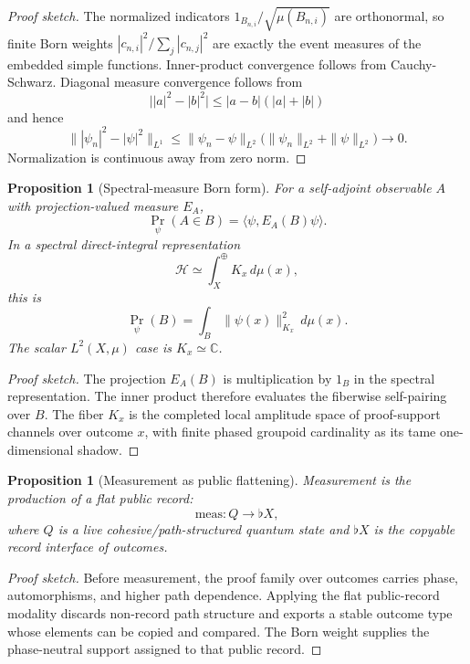 \documentclass[11pt]{article}
\theoremstyle{plain}
\newtheorem{proposition}[theorem]{Proposition}
\theoremstyle{definition}
\theoremstyle{remark}
\newenvironment{proofsketch}{\begin{proof}[Proof sketch]}{\end{proof}}
\newcommand{\Flat}{\flat}
\newcommand{\C}{\mathbb{C}}
\begin{document}
\begin{proofsketch}
The normalized indicators \(1_{B_{n,i}}/\sqrt{\mu(B_{n,i})}\) are orthonormal, so finite Born weights \(|c_{n,i}|^2/\sum_j|c_{n,j}|^2\) are exactly the event measures of the embedded simple functions. Inner-product convergence follows from Cauchy-Schwarz. Diagonal measure convergence follows from
\[
\bigl||a|^2-|b|^2\bigr|\le |a-b|(|a|+|b|)
\]
and hence
\[
\||\psi_n|^2-|\psi|^2\|_{L^1}
\le
\|\psi_n-\psi\|_{L^2}
\bigl(\|\psi_n\|_{L^2}+\|\psi\|_{L^2}\bigr)\to0.
\]
Normalization is continuous away from zero norm.
\end{proofsketch}

\begin{proposition}[Spectral-measure Born form]
For a self-adjoint observable \(A\) with projection-valued measure \(E_A\),
\[
\Pr_\psi(A\in B)=\langle\psi,E_A(B)\psi\rangle.
\]
In a spectral direct-integral representation
\[
\mathcal{H}\simeq\int_X^\oplus K_x\,d\mu(x),
\]
this is
\[
\Pr_\psi(B)=\int_B\|\psi(x)\|_{K_x}^2\,d\mu(x).
\]
The scalar \(L^2(X,\mu)\) case is \(K_x\simeq\C\).
\end{proposition}

\begin{proofsketch}
The projection \(E_A(B)\) is multiplication by \(1_B\) in the spectral representation. The inner product therefore evaluates the fiberwise self-pairing over \(B\). The fiber \(K_x\) is the completed local amplitude space of proof-support channels over outcome \(x\), with finite phased groupoid cardinality as its tame one-dimensional shadow.
\end{proofsketch}

\begin{proposition}[Measurement as public flattening]
Measurement is the production of a flat public record:
\[
\mathrm{meas}:Q\to\Flat X,
\]
where \(Q\) is a live cohesive/path-structured quantum state and \(\Flat X\) is the copyable record interface of outcomes.
\end{proposition}

\begin{proofsketch}
Before measurement, the proof family over outcomes carries phase, automorphisms, and higher path dependence. Applying the flat public-record modality discards non-record path structure and exports a stable outcome type whose elements can be copied and compared. The Born weight supplies the phase-neutral support assigned to that public record.
\end{proofsketch}
\end{document}
